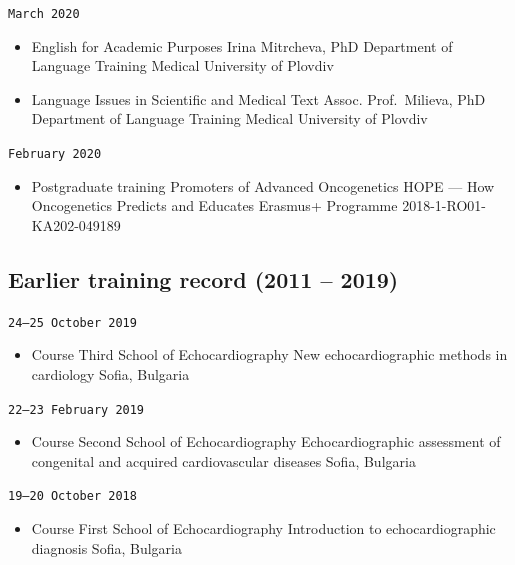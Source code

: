 \documentclass[
  10.5pt,
  a4paper,
  DIV=11,
  numbers=noendperiod]{scrartcl}
\providecommand{\tightlist}{%
  \setlength{\itemsep}{0pt}\setlength{\parskip}{0pt}}
\let\oldtexttt\texttt
\renewcommand{\texttt}[1]{{\color{cvbronze}\small\oldtexttt{#1}}}
\begin{document}
\texttt{March\ 2020}

\begin{itemize}
\tightlist
\item
  English for Academic Purposes \textbar{} Irina Mitrcheva, PhD
  \textbar{} Department of Language Training \textbar{} Medical
  University of Plovdiv
\item
  Language Issues in Scientific and Medical Text \textbar{} Assoc.
  Prof.~Milieva, PhD \textbar{} Department of Language Training
  \textbar{} Medical University of Plovdiv
\end{itemize}

\texttt{February\ 2020}

\begin{itemize}
\tightlist
\item
  Postgraduate training \textbar{} Promoters of Advanced Oncogenetics
  \textbar{} HOPE --- How Oncogenetics Predicts and Educates \textbar{}
  Erasmus+ Programme 2018-1-RO01-KA202-049189
\end{itemize}

\subsection{Earlier training record (2011 --
2019)}\label{earlier-training-record-2011-2019}

\texttt{24–25\ October\ 2019}

\begin{itemize}
\tightlist
\item
  Course \textbar{} Third School of Echocardiography \textbar{} New
  echocardiographic methods in cardiology \textbar{} Sofia, Bulgaria
\end{itemize}

\texttt{22–23\ February\ 2019}

\begin{itemize}
\tightlist
\item
  Course \textbar{} Second School of Echocardiography \textbar{}
  Echocardiographic assessment of congenital and acquired cardiovascular
  diseases \textbar{} Sofia, Bulgaria
\end{itemize}

\texttt{19–20\ October\ 2018}

\begin{itemize}
\tightlist
\item
  Course \textbar{} First School of Echocardiography \textbar{}
  Introduction to echocardiographic diagnosis \textbar{} Sofia, Bulgaria
\end{itemize}
\end{document}
